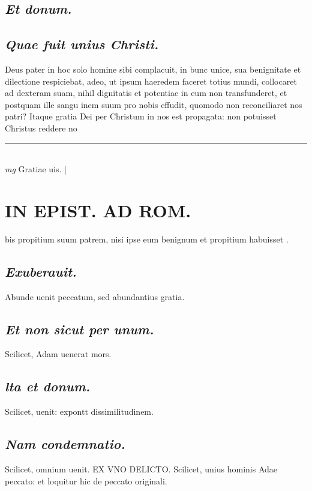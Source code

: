 \documentclass{article}
\begin{document}
\begin{pages}
\subsection*{\textit{Et donum. }}
{}
\subsection*{\textit{Quae fuit unius Christi. }}\pstart Deus pater in hoc solo homine sibi complacuit, in bunc unice, sua benignitate et dilectione respiciebat, adeo, ut ipsum haeredem faceret totius mundi, collocaret ad dexteram suam, nihil dignitatis et potentiae in eum non transfunderet, et postquam ille sangu inem suum pro nobis effudit, quomodo non reconciliaret nos patri? Itaque gratia Dei per Christum in nos est propagata: non potuisset Christus reddere no\pend
\vspace{0.5cm}\noindent
\vspace{0.2cm}\rule{1cm}{0.2pt}\\ 
\hspace{0.2cm}\textit{mg}
\footnotesize Gratiae uis. 
\normalsize| 
\section*{IN EPIST. AD ROM.  }
\marginpar{[ p.54 ]}\pstart bis propitium suum patrem, nisi ipse eum benignum et propitium habuisset .  \pend
{}
{}
\subsection*{\textit{Exuberauit. }}\pstart Abunde uenit peccatum, sed abundantius gratia.   \pend
{}
{}
\subsection*{\textit{Et non sicut per unum. }}\pstart Scilicet, Adam uenerat mors.   \pend
{}
{}
\subsection*{\textit{lta et donum. }}\pstart Scilicet, uenit: expontt dissimilitudinem.   \pend
{}
{}
\subsection*{\textit{Nam condemnatio. }}\pstart Scilicet, omnium uenit. EX VNO DELICTO. Scilicet, unius hominis Adae peccato: et loquitur hic de peccato originali.   \pend
{}
{}

\end{pages}
\end{document}

